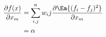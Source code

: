 \begin{align*}
	\frac{\partial f(x)}{\partial x_m}
	 & = \sum_{i,j}^{n} w_ij {\frac{\partial{}\Ea{(f_i-f_j)^2}}{\partial{} x_m}} \\
	 & = \alpha
\end{align*}
